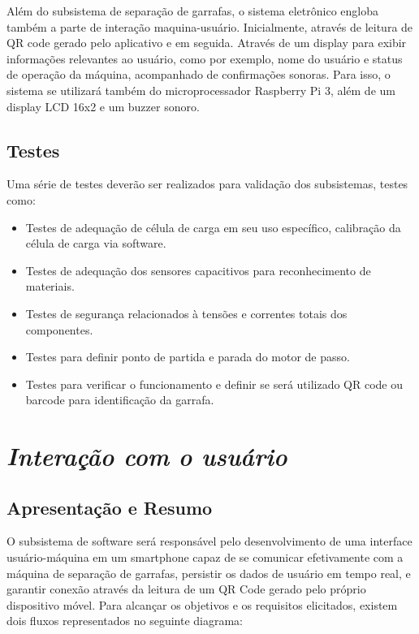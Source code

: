     Além do subsistema de separação de garrafas, o sistema eletrônico engloba também a parte de interação maquina-usuário. Inicialmente, através de leitura de QR code gerado pelo aplicativo e em seguida. Através de um display para exibir informações relevantes ao usuário, como por exemplo, nome do usuário e status de operação da máquina, acompanhado de confirmações sonoras. Para isso, o sistema se utilizará também do microprocessador Raspberry Pi 3, além de um display LCD 16x2 e um buzzer sonoro.

\subsection{Testes}

    Uma série de testes deverão ser realizados para validação dos subsistemas, testes como:

\begin{itemize}
\item Testes de adequação de célula de carga em seu uso específico, calibração da célula de carga via software.
\item Testes de adequação dos sensores capacitivos para reconhecimento de materiais.
\item Testes de segurança relacionados à tensões e correntes totais dos componentes.
\item Testes para definir ponto de partida e parada do motor de passo.
\item Testes para verificar o funcionamento e definir se será utilizado QR code ou barcode para identificação da garrafa.
\end{itemize}

\section{\textit{Interação com o usuário}}

\subsection{Apresentação e Resumo}
    O subsistema de software será responsável pelo desenvolvimento de uma interface usuário-máquina em um smartphone capaz de se comunicar efetivamente com a máquina de separação de garrafas, persistir os dados de usuário em tempo real, e garantir conexão através da leitura de um QR Code gerado pelo próprio dispositivo móvel. Para alcançar os objetivos e os requisitos elicitados, existem dois fluxos representados no seguinte diagrama: 

